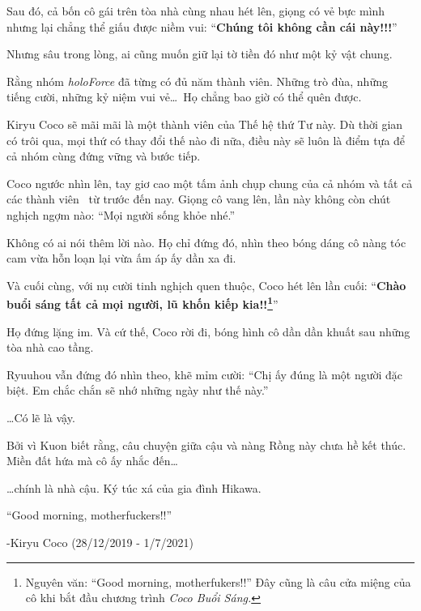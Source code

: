 \documentclass[../main.tex]{subfiles}
\begin{document}
Sau đó, cả bốn cô gái trên tòa nhà cùng nhau hét lên, giọng có vẻ bực mình nhưng lại chẳng thể giấu được niềm vui: ``\textbf{Chúng tôi không cần cái này!!!}''

Nhưng sâu trong lòng, ai cũng muốn giữ lại tờ tiền đó như một kỷ vật chung.

Rằng nhóm \textit{holoForce} đã từng có đủ năm thành viên. Những trò đùa, những tiếng cười, những kỷ niệm vui vẻ\dots\ Họ chẳng bao giờ có thể quên được.

Kiryu Coco sẽ mãi mãi là một thành viên của Thế hệ thứ Tư này. Dù thời gian có trôi qua, mọi thứ có thay đổi thế nào đi nữa, điều này sẽ luôn là điểm tựa để cả nhóm cùng đứng vững và bước tiếp.

Coco ngước nhìn lên, tay giơ cao một tấm ảnh chụp chung của cả nhóm và tất cả các thành viên \hll\ từ trước đến nay. Giọng cô vang lên, lần này không còn chút nghịch ngợm nào: ``Mọi người sống khỏe nhé.''

Không có ai nói thêm lời nào. Họ chỉ đứng đó, nhìn theo bóng dáng cô nàng tóc cam vừa hỗn loạn lại vừa ấm áp ấy dần xa đi.

Và cuối cùng, với nụ cười tinh nghịch quen thuộc, Coco hét lên lần cuối: ``\textbf{Chào buổi sáng tất cả mọi người, lũ khốn kiếp kia!!\footnote{Nguyên văn: ``Good morning, motherfukers!!'' Đây cũng là câu cửa miệng của cô khi bắt đầu chương trình \textit{Coco Buổi Sáng.}}}''


Họ đứng lặng im. Và cứ thế, Coco rời đi, bóng hình cô dần dần khuất sau những tòa nhà cao tầng.

Ryuuhou vẫn đứng đó nhìn theo, khẽ mỉm cười: ``Chị ấy đúng là một người đặc biệt. Em chắc chắn sẽ nhớ những ngày như thế này.''

\dots Có lẽ là vậy.

Bởi vì Kuon biết rằng, câu chuyện giữa cậu và nàng Rồng này chưa hề kết thúc. Miền đất hứa mà cô ấy nhắc đến\dots

\dots chính là nhà cậu. Ký túc xá của gia đình Hikawa.

\il


``Good morning, motherfuckers!!''

\begin{flushright}
  -Kiryu Coco (28/12/2019 - 1/7/2021)
\end{flushright}
\end{document}

